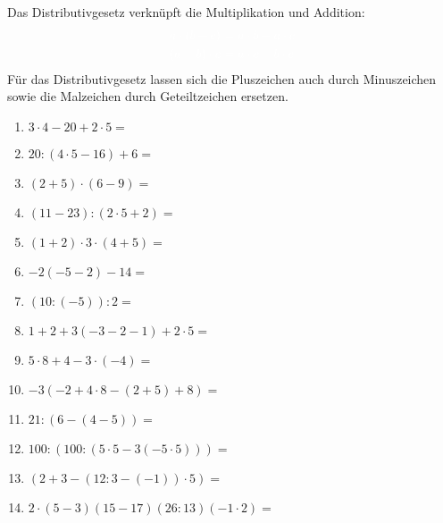 Das Distributivgesetz verknüpft die Multiplikation und Addition:
\begin{align*}
	\textcolor{loes}{a\cdot\left( b+c\right)\ }&\textcolor{loes}{=a\cdot b+a\cdot c}\\
	\textcolor{loes}{\left( a+b\right) \cdot c\ }&\textcolor{loes}{=a\cdot c+b\cdot c }
\end{align*}
Für das Distributivgesetz lassen sich die Pluszeichen auch durch Minuszeichen sowie die Malzeichen durch Geteiltzeichen ersetzen.
\newpage
\begin{Exercise}[title={Berechne die folgenden Ausdrücke}, label=einfachesRechnenA1]

	\begin{minipage}{\textwidth}
		\begin{minipage}{0.49\textwidth}
			\begin{enumerate}[label=\alph*)]
				\item \(3\cdot 4-20+2\cdot 5=\)
				\item \(20:\left( 4\cdot 5-16\right) +6=\)
				\item \(\left( 2+5\right) \cdot \left( 6-9\right) =\)
				\item \(\left( 11-23\right) :\left( 2\cdot 5+2\right) =\)
				\item \(\left( 1+2\right) \cdot3\cdot\left( 4+5\right) =\)
				\item \(-2\left( -5-2\right) -14=\)
				\item \(\left( 10:\left( -5\right)\right)  :2=\)
				\item \(1+2+3\left( -3-2-1\right) +2\cdot 5=\)
				\item \(5\cdot 8+4-3\cdot \left( -4\right) =\)
				\item \(-3\left( -2+4\cdot 8-\left( 2+5\right) +8\right) =\)
				\item \(21:\left( 6-\left( 4-5\right) \right) =\)
				\item \(100:\left( 100:\left( 5\cdot 5-3\left( -5\cdot 5\right) \right) \right) =\)
				\item \(\left( 2+3-\left( 12:3-\left( -1\right) \right)\cdot 5 \right) =\)
			\end{enumerate}
		\end{minipage}
		\begin{minipage}{0.49\textwidth}
			\begin{enumerate}[label=\alph*)]
				\setcounter{enumi}{13}
				\item \(2\cdot\left(5-3\right) \left( 15-17\right) \left( 26:13\right) \left( -1\cdot 2\right) = \)

\end{enumerate}
\end{minipage}
\end{minipage}
\end{Exercise}
